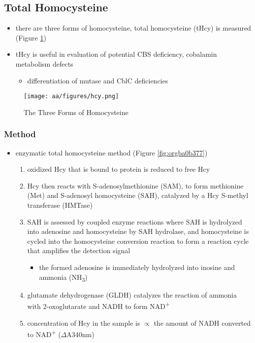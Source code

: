 \documentclass[12pt]{scrartcl}
\begin{document}
\subsection{Total Homocysteine}
\label{sec:org3489578}
\begin{itemize}
\item there are three forms of homocysteine, total homocysteine (tHcy) is
measured (Figure \ref{fig:orgca2db93})
\item tHcy is useful in evaluation of potential CBS deficiency, cobalamin
metabolism defects
\begin{itemize}
\item differentiation of mutase and CblC deficiencies
\end{itemize}
\end{itemize}


\begin{figure}[htbp]
\centering
\texttt{[image: aa/figures/hcy.png]}
\caption{\label{fig:orgca2db93}The Three Forms of Homocysteine}
\end{figure}

\subsubsection{Method}
\label{sec:org01758da}
\begin{itemize}
\item enzymatic total homocysteine method (Figure \ref{fig:orgba0b377})
\begin{enumerate}
\item oxidized Hcy that is bound to protein is reduced to free Hcy
\item Hcy then reacts with S-adenosylmethionine (SAM), to form methionine
(Met) and S-adenosyl homocysteine (SAH), catalyzed by a Hcy
S-methyl transferase (HMTase)
\item SAH is assessed by coupled enzyme reactions where SAH is hydrolyzed
into adenosine and homocysteine by SAH hydrolase, and homocysteine
is cycled into the homocysteine conversion reaction to form a
reaction cycle that amplifies the detection signal
\begin{itemize}
\item the formed adenosine is immediately hydrolyzed into inosine and
ammonia (NH\textsubscript{3})
\end{itemize}
\item glutamate dehydrogenase (GLDH) catalyzes the reaction of ammonia
with 2-oxoglutarate and NADH to form NAD\textsuperscript{+}
\item concentration of Hcy in the sample is \(\propto\) the amount of NADH
converted to NAD\textsuperscript{+} (\(\Delta\)A340nm)
\end{enumerate}
\end{itemize}
\end{document}
